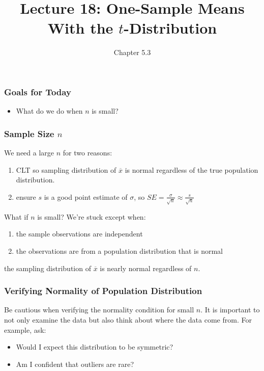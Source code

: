 \documentclass[handout]{beamer}
\title{Lecture 18: One-Sample Means With the $t$-Distribution}
\author{Chapter 5.3}
\date{}
\newcommand{\blue}[1]{\textcolor{blue2}{#1}}
\newcommand{\xbar}{\overline{x}}
\begin{document}
\begin{frame}
\titlepage
\end{frame}


\begin{frame}[fragile]
\frametitle{Goals for Today}

\begin{itemize}
\item What do we do when $n$ is small?  
\end{itemize}

\end{frame}


\begin{frame}[fragile]
\frametitle{Sample Size $n$}
%
%
We need a \blue{large $n$} for two reasons:

\begin{enumerate}
\item CLT so sampling distribution of $\xbar$ is normal regardless of the true population distribution. 
\item ensure $s$ is a good point estimate of $\sigma$, so $SE = \frac{\sigma}{\sqrt{n}} \approx \frac{s}{\sqrt{n}}$
\end{enumerate}

\pause \vspace{0.5cm}

What if $n$ is small?  We're stuck \blue{except when}: 
\begin{enumerate}
\item the sample observations are independent
\item the observations are from a population distribution that is normal
\end{enumerate}
the sampling distribution of $\xbar$ is nearly normal \blue{regardless} of $n$.

\end{frame}


\begin{frame}[fragile]
\frametitle{Verifying Normality of Population Distribution}

Be cautious when verifying the normality condition for small $n$. It is important to not only examine the data but also think about where the data come from. For example, ask:
\begin{itemize}
\item Would I expect this distribution to be symmetric?
\item Am I confident that outliers are rare?
\end{itemize}

\end{frame}
\end{document}
